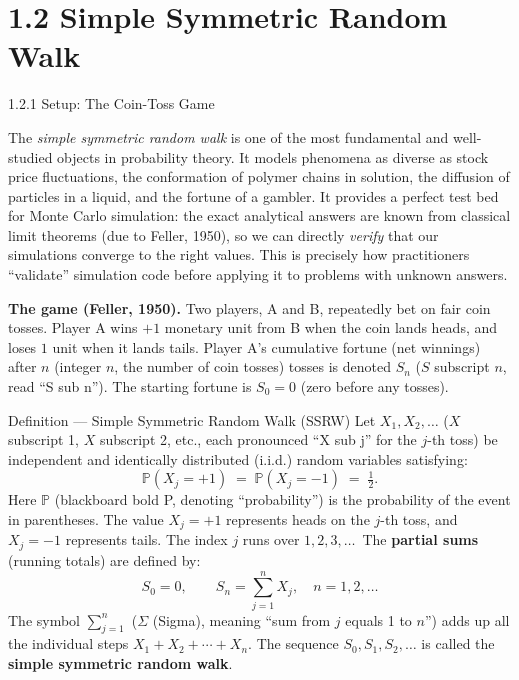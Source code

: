 \documentclass[aspectratio=169,10pt]{beamer}
\begin{document}
\section{1.2 Simple Symmetric Random Walk}

\begin{frame}[allowframebreaks]{1.2.1 Setup: The Coin-Toss Game}

  The \emph{simple symmetric random walk} is one of the most fundamental and
  well-studied objects in probability theory.  It models phenomena as diverse
  as stock price fluctuations, the conformation of polymer chains in solution,
  the diffusion of particles in a liquid, and the fortune of a gambler.  It
  provides a perfect test bed for Monte Carlo simulation: the exact analytical
  answers are known from classical limit theorems (due to Feller, 1950), so we
  can directly \emph{verify} that our simulations converge to the right values.
  This is precisely how practitioners ``validate'' simulation code before
  applying it to problems with unknown answers.

  \textbf{The game (Feller, 1950).}  Two players, A and B, repeatedly bet on
  fair coin tosses.  Player A wins $+1$ monetary unit from B when the coin
  lands heads, and loses $1$ unit when it lands tails.  Player A's cumulative
  fortune (net winnings) after $n$ (integer $n$, the number of coin tosses)
  tosses is denoted $S_n$ ($S$ subscript $n$, read ``S sub n'').  The starting
  fortune is $S_0 = 0$ (zero before any tosses).

  \begin{block}{Definition --- Simple Symmetric Random Walk (SSRW)}
    Let $X_1, X_2, \ldots$ ($X$ subscript 1, $X$ subscript 2, etc., each
    pronounced ``X sub j'' for the $j$-th toss) be independent and identically
    distributed (i.i.d.) random variables satisfying:
    \[
      \mathbb{P}(X_j = +1) \;=\; \mathbb{P}(X_j = -1) \;=\; \tfrac{1}{2}.
    \]
    Here $\mathbb{P}$ (blackboard bold P, denoting ``probability'') is the
    probability of the event in parentheses.  The value $X_j = +1$ represents
    heads on the $j$-th toss, and $X_j = -1$ represents tails.  The index $j$
    runs over $1, 2, 3, \ldots$\,  The \textbf{partial sums} (running totals)
    are defined by:
    \[
      S_0 = 0, \qquad S_n = \sum_{j=1}^{n} X_j, \quad n = 1, 2, \ldots
    \]
    The symbol $\sum_{j=1}^{n}$ ($\Sigma$ (Sigma), meaning ``sum from $j$
    equals 1 to $n$'') adds up all the individual steps
    $X_1 + X_2 + \cdots + X_n$.  The sequence $S_0, S_1, S_2, \ldots$ is
    called the \textbf{simple symmetric random walk}.
  \end{block}


\end{frame}
\end{document}
